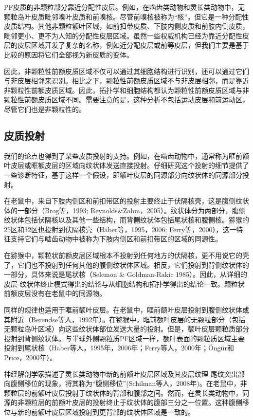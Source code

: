 PF皮质的非颗粒部分靠近分配性皮层。例如，在啮齿类动物和灵长类动物中，无颗粒岛叶皮质毗邻嗅叶皮质和前嗅核。尽管前嗅核被称为“核”，但它是一种分配性皮质结构。其他非颗粒额叶区域，如前扣带皮质、下肢内侧皮质和前肢内侧皮质，毗邻更小、更不为人知的分配性皮层区域。虽然一些权威机构已经为靠近分配性皮层的皮层区域开发了复杂的名称，例如近分配皮层或前等皮层，但我们主要是基于比较的原因将它们全部视为新皮质的变体。

因此，非颗粒性前额皮质区域不仅可以通过其细胞结构进行识别，还可以通过它们与非皮层相邻来识别。相比之下，颗粒性前额皮质区域不与非皮层相邻，而是靠近非颗粒性前额皮质区域。因此，拓扑学和细胞结构都认为颗粒性前额皮质区域与非颗粒性前额皮质区域不同。需要注意的是，这种分析不包括运动皮层和前运动区，尽管它们也是非颗粒性的。

\subsection{皮质投射}
我们的论点也得到了某些皮质投射的支持。例如，在啮齿动物中，通常称为眶前额叶皮层或眶额皮层的区域向纹状体发送直接投射。仔细研究这个投射的细节提供了一些诊断特征，基于这样一个假设，即额叶皮层的同源部分向纹状体的同源部分投射。

在老鼠中，来自下肢内侧区和前扣带区的投射主要终止于伏隔核壳，这是腹侧纹状体的一部分（Brog等，1993; Reynolds\&Zahm，2005）。纹状体分为两部分，腹侧纹状体包括伏隔核以及其他一些结构，而背侧纹状体包括尾状核和腹侧核。猕猴的25区和32区也投射到伏隔核壳（Haber等，1995，2006; Ferry等，2000），这一特征支持它们与啮齿动物中被称为下肢内侧区和前扣带区的区域的同源性。

在猕猴中，颗粒状前额皮层区域根本不投射到任何地方的伏隔核，更不用说它的壳了，它们也不投射到任何其他的腹侧纹状体区域。相反，它们投射到背侧纹状体的一部分，具体来说是尾状核（Selemon \& Goldman-Rakic 1985）。因此，从详细的皮层-纹状体终止模式得出的结论与从细胞结构和拓扑学得出的结论一致。颗粒状前额皮层没有在老鼠中的同源物。

同样的规律也适用于眶前额叶皮层。在老鼠中，眶前额叶皮层投射到腹侧纹状体或其附近（Berendse等人，1992年）。在猕猴中，眶前额叶皮层的无颗粒部分（包括无颗粒岛叶区域）向这些纹状体部位发送大量的投射。但是，额叶皮层颗粒质部分投射到背侧纹状体。与半球外侧颗粒质PF区域一样，额叶表面的颗粒质区域主要投射到尾状核（Haber等人，1995年，2006年；Ferry等人，2000年；Öngür和Price，2000年）。

神经解剖学家描述了灵长类动物中新的前额叶皮层区域及其皮层纹理-尾纹突出部向腹侧移位的现象，将其称为“腹侧移位”(Schilman等人，2008年)。在老鼠中，非颗粒层的前额叶皮层投射于纹状体的背部和腹部之间。然而，在灵长类动物中，同源的非颗粒层的前额叶皮层的投射终止于纹状体的腹部三分之一位置。这种腹侧移位与新的前额叶皮层区域投射到更背部的纹状体区域是一致的。

